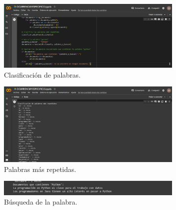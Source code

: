 \documentclass[conference]{IEEEtran}
\begin{document}
\begin{figure}[h]
  \centering
  \includegraphics[width=9cm]{WhatsApp Image 2023-09-11 at 9.15.10 PM.jpeg}
  \caption{Clasificación de palabras.}
  \label{fig:clasificacion}
\end{figure}
\vspace{5cm}

\begin{figure}[h]
  \centering
  \includegraphics[width=9cm]{WhatsApp Image 2023-09-11 at 9.15.23 PM.jpeg}
  \caption{Palabras más repetidas.}
  \label{fig:repetidas}
\end{figure}

\begin{figure}[h]
  \centering
  \includegraphics[width=9cm]{WhatsApp Image 2023-09-11 at 9.15.41 PM.jpeg}
  \caption{Búsqueda de la palabra.}
  \label{fig:busqueda}
\end{figure}
\end{document}

